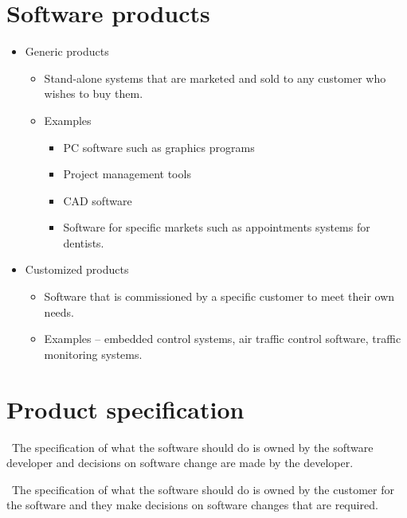 \documentclass{article}
\begin{document}
\section{Software products}
\vspace{-8pt}
\begin{itemize}
  \setlength\itemsep{-.25em}
  \item Generic products
    \begin{itemize}
	  \vspace{-8pt}
      \setlength\itemsep{-.25em}
      \item Stand-alone systems that are marketed and sold to any customer who
wishes to buy them.
      \item Examples
        \begin{itemize}
	      \vspace{-4pt}
          \setlength\itemsep{-.25em}
          \item PC software such as graphics programs
          \item Project management tools
          \item CAD software
          \item Software for specific markets such as appointments systems for dentists.
        \end{itemize}
    \end{itemize}
  \item Customized products
    \begin{itemize}
	  \vspace{-8pt}
      \setlength\itemsep{-.25em}
      \item Software that is commissioned by a specific customer to meet their own needs.
      \item Examples – embedded control systems, air traffic control software, traffic monitoring systems.
    \end{itemize}
\end{itemize}

\section{Product specification}
\vspace{-8pt}
\begin{description}
  \setlength\itemsep{-.25em}
  \item [Generic products] \
  The specification of what the software should do is owned by the software developer and decisions on software change are made by the developer.
  \item [Customized products] \
  The specification of what the software should do is owned by the customer for the software and they make decisions on software changes that are required.
\end{description}
\end{document}
